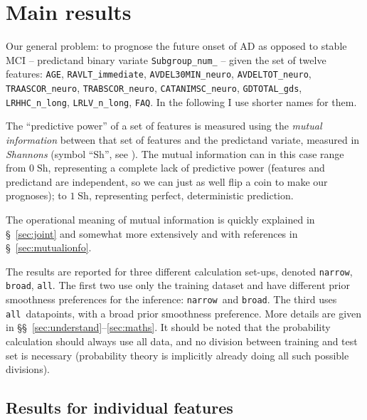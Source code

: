 \documentclass[\ifafour a4paper,12pt,\else a5paper,10pt,\fi%
onecolumn,oneside,article,%
british%
]{memoir}
\theoremstyle{remark}
\theoremstyle{innote}
\renewcommand*{\|}[1][]{\nonscript\:#1\vert\nonscript\:\mathopen{}}
\newcommand*{\sect}{\S}%
\newcommand*{\sects}{\S\S}%
\newcommand*{\bit}{\textrm{Sh}}
\newcommand*{\narrow}{\texttt{narrow}}
\newcommand*{\broad}{\texttt{broad}}
\newcommand*{\all}{\texttt{all}}
\begin{document}
\section{Main results}
\label{sec:main_res}

Our general problem: to prognose the future onset of AD as opposed to
stable MCI -- predictand binary variate \texttt{Subgroup\_num\_} -- given
the set of twelve features: \texttt{AGE}, \texttt{RAVLT\_immediate},
\texttt{AVDEL30MIN\_neuro}, \texttt{AVDELTOT\_neuro},
\texttt{TRAASCOR\_neuro}, \texttt{TRABSCOR\_neuro},
\texttt{CATANIMSC\_neuro}, \texttt{GDTOTAL\_gds}, \texttt{LRHHC\_n\_long},
\texttt{LRLV\_n\_long}, \texttt{FAQ}. In the following I use shorter names
for them.

The \enquote{predictive power} of a set of features is measured using the
\emph{mutual information} between that set of features and the predictand
variate, measured in \emph{Shannons} (symbol \enquote{$\bit$}, see
\textcite{iso2008c}). The mutual information can in this case range from
$0\;\bit$, representing a complete lack of predictive power (features and
predictand are independent, so we can just as well flip a coin to make our
prognoses); to $1\;\bit$, representing perfect, deterministic prediction.

The operational meaning of mutual
information is quickly explained in \sect~\ref{sec:joint} and somewhat
more extensively and with references in \sect~\ref{sec:mutualionfo}.

The results are reported for three different calculation set-ups, denoted
\narrow, \broad, \all. The first two use only the training dataset and have
different prior smoothness preferences for the inference: \narrow\ and
\broad. The third uses \all\ datapoints, with a broad prior smoothness
preference. More details are given in
\sects~\ref{sec:understand}--\ref{sec:maths}. It should be noted that the
probability calculation should always use all data, and no division between
training and test set is necessary (probability theory is implicitly
already doing all such possible divisions).


\subsection{Results for individual features}
\label{sec:indiv_features}
\end{document}
